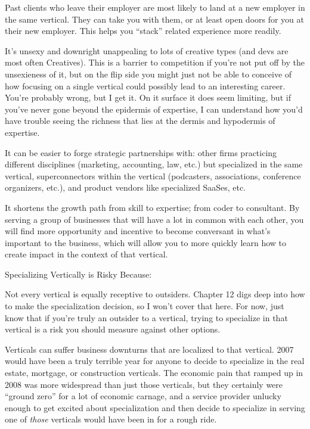 Past clients who leave their employer are most likely to land at a new employer in the same vertical. They can take you with them, or at least open doors for you at their new employer. This helps you ``stack'' related experience more readily.

It's unsexy and downright unappealing to lots of creative types (and devs are most often Creatives). This is a barrier to competition if you're not put off by the unsexieness of it, but on the flip side you might just not be able to conceive of how focusing on a single vertical could possibly lead to an interesting career. You're probably wrong, but I get it. On it surface it does seem limiting, but if you've never gone beyond the epidermis of expertise, I can understand how you'd have trouble seeing the richness that lies at the dermis and hypodermis of expertise.

It can be easier to forge strategic partnerships with: other firms practicing different disciplines (marketing, accounting, law, etc.) but specialized in the same vertical, superconnectors within the vertical (podcasters, associations, conference organizers, etc.), and product vendors like specialized SaaSes, etc.

It shortens the growth path from skill to expertise; from coder to consultant. By serving a group of businesses that will have a lot in common with each other, you will find more opportunity and incentive to become conversant in what's important to the business, which will allow you to more quickly learn how to create impact in the context of that vertical.

Specializing Vertically is Risky Because:

Not every vertical is equally receptive to outsiders. Chapter 12 digs deep into how to make the specialization decision, so I won't cover that here. For now, just know that if you're truly an outsider to a vertical, trying to specialize in that vertical is a risk you should measure against other options.

Verticals can suffer business downturns that are localized to that vertical. 2007 would have been a truly terrible year for anyone to decide to specialize in the real estate, mortgage, or construction verticals. The economic pain that ramped up in 2008 was more widespread than just those verticals, but they certainly were ``ground zero'' for a lot of economic carnage, and a service provider unlucky enough to get excited about specialization and then decide to specialize in serving one of \emph{those} verticals would have been in for a rough ride.

